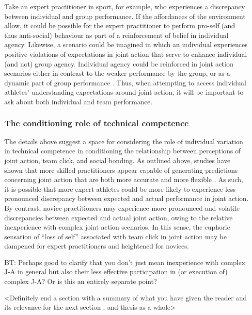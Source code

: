 \begin{CJK}{UTF8}{gbsn}
{Take an expert practitioner in sport, for example, who experiences a discrepancy between individual and group performance. If the affordances of the environment allow, it could be possible for the expert practitioner to perform pro-self (and thus anti-social) behaviour as part of a reinforcement of belief in individual agency.  Likewise, a scenario could be imagined in which an individual experiences positive violations of expectations in joint action that serve to enhance individual (and not) group agency.  Individual agency could be reinforced in joint action scenarios either in contrast to the weaker performance by the group, or as a dynamic part of group performance \citep[in a similar sense to the theory of identity fusion, outlined above][]{Swann2009,Swann2015}. Thus, when attempting to access individual athletes' understanding expectations around joint action, it will be important to ask about both individual and team performance.


\subsubsection{The conditioning role of technical competence}
The details above suggest a space for considering the role of individual variation in technical competence in conditioning the relationship between perceptions of joint action, team click, and social bonding.  As outlined above, studies have shown that more skilled practitioners appear capable of generating predictions concerning joint action that are both more accurate and more flexible \citep{Schmidt2011,Tomeo2012,Caron2017}.  As such, it is possible that more expert athletes could be more likely to experience less pronounced discrepancy between expected and actual performance in joint action. By contrast, novice practitioners may experience more pronounced and volatile discrepancies between expected and actual joint action, owing to the relative inexperience with complex joint action scenarios.  In this sense, the euphoric sensation of ``loss of self'' associated with team click in joint action may be dampened for expert practitioners and heightened for novices.

BT: Perhaps good to clarify that you don’t just mean inexperience with complex J-A in general but also their less effective participation in (or execution of) complex J-A? Or is this an entirely separate point?

<Definitely end a section with a summary of what you have given the reader and its relevance for the next section , and thesis as a whole>


}
\end{CJK}
